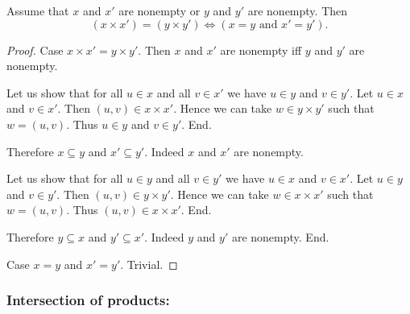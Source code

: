 \documentclass[../../set-theory.ftl.tex]{subfiles}
\begin{document}
  \begin{forthel}
    \begin{proposition}\label{SetTheory_01_06_472623}
      Assume that $x$ and $x'$ are nonempty or $y$ and $y'$ are nonempty.
      Then \[ (x \times x') = (y \times y') \iff (\text{$x = y$ and $x' = y'$}). \]
    \end{proposition}
    \begin{proof}
      Case $x \times x' = y \times y'$.
        Then $x$ and $x'$ are nonempty iff $y$ and $y'$ are nonempty.

        Let us show that for all $u \in x$ and all $v \in x'$ we have $u \in y$ and $v \in y'$.
          Let $u \in x$ and $v \in x'$.
          Then $(u,v) \in x \times x'$.
          Hence we can take $w \in y \times y'$ such that $w = (u,v)$.
          Thus $u \in y$ and $v \in y'$.
        End.

        Therefore $x \subseteq y$ and $x' \subseteq y'$.
        Indeed $x$ and $x'$ are nonempty.

        Let us show that for all $u \in y$ and all $v \in y'$ we have $u \in x$ and $v \in x'$.
          Let $u \in y$ and $v \in y'$.
          Then $(u,v) \in y \times y'$.
          Hence we can take $w \in x \times x'$ such that $w = (u,v)$.
          Thus $(u,v) \in x \times x'$.
        End.

        Therefore $y \subseteq x$ and $y' \subseteq x'$.
        Indeed $y$ and $y'$ are nonempty.
      End.

      Case $x = y$ and $x' = y'$. Trivial.
    \end{proof}
  \end{forthel}


  \subsubsection*{Intersection of products:}
\end{document}
